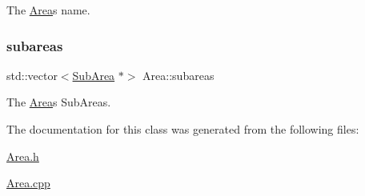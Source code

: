 The \hyperlink{classArea}{Area}\textquotesingle{}s name. 

\mbox{\label{classArea_af5eafd40b41ae847a009feef631ce07f}} 
\subsubsection{\texorpdfstring{subareas}{subareas}}
{\footnotesize\ttfamily std\+::vector$<$\hyperlink{classSubArea}{Sub\+Area} $\ast$$>$ Area\+::subareas\hspace{0.3cm}{\ttfamily [private]}}



The \hyperlink{classArea}{Area}\textquotesingle{}s Sub\+Areas. 



The documentation for this class was generated from the following files\+:\begin{DoxyCompactItemize}
\item 
\hyperlink{Area_8h}{Area.\+h}\item 
\hyperlink{Area_8cpp}{Area.\+cpp}\end{DoxyCompactItemize}
